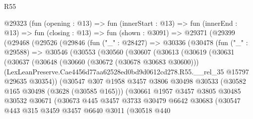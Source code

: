 \begin{lexlean}{R55}
\begin{coremodule}
      @29323
        (fun (opening : @13) =>
        fun (innerStart : @13) =>
        fun (innerEnd : @13) =>
        fun (closing : @13) =>
        fun (shown : @3091) =>
        @29371
          (@29399
            (@29468
              (@29526
                (@29846
                  (fun ("_" : @28427) =>
                  @30336
                    (@30478
                      (fun ("_" : @29588) =>
                      @30546
                        (@30553
                          (@30560
                            (@30607
                              (@30613
                                (@30619
                                  (@30631
                                    (@30637
                                      (@30648
                                        (@30660 (@30672 (@30678 @30683 @30600)))
                                        (LexLeanPreserve.Cae4456d77aa62528ed0bd9d0612cd278.R55.__rel_35
                                          @15797
                                          @29635
                                          @30354))
                                      (@30547
                                        @307
                                        @1958
                                        @3457
                                        @3806
                                        @30498
                                        @30533
                                        (@30582 @165 @30498 (@3628 (@30585 @165)))
                                        (@30661
                                          @1957
                                          @3457
                                          @3805
                                          @30485
                                          @30532
                                          @30671
                                          (@30673
                                            @445
                                            @3457
                                            @3733
                                            @30479
                                            @6642
                                            @30683
                                            (@30547
                                              @443
                                              @315
                                              @3459
                                              @3457
                                              @6640
                                              @3011
                                              (@30518
                                                @440

\end{coremodule}
\end{lexlean}
